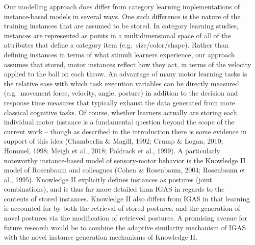 \documentclass[
  jou, donotrepeattitle,floatsintext]{apa7}
\begin{document}
Our modelling approach does differ from category learning implementations of instance-based models in several ways. One such difference is the nature of the training instances that are assumed to be stored. In category learning studies, instances are represented as points in a multidimensional space of all of the attributes that define a category item (e.g.~size/color/shape). Rather than defining instances in terms of what stimuli learners experience, our approach assumes that stored, motor instances reflect how they act, in terms of the velocity applied to the ball on each throw. An advantage of many motor learning tasks is the relative ease with which task execution variables can be directly measured (e.g.~movement force, velocity, angle, posture) in addition to the decision and response time measures that typically exhaust the data generated from more classical cognitive tasks. Of course, whether learners actually are storing each individual motor instance is a fundamental question beyond the scope of the current work -- though as described in the introduction there is some evidence in support of this idea (Chamberlin \& Magill, 1992; Crump \& Logan, 2010; Hommel, 1998; Meigh et al., 2018; Poldrack et al., 1999). A particularly noteworthy instance-based model of sensory-motor behavior is the Knowledge II model of Rosenbaum and colleagues (Cohen \& Rosenbaum, 2004; Rosenbaum et al., 1995). Knowledge II explicitly defines instances as postures (joint combinations), and is thus far more detailed than IGAS in regards to the contents of stored instances. Knowledge II also differs from IGAS in that learning is accounted for by both the retrieval of stored postures, and the generation of novel postures via the modification of retrieved postures. A promising avenue for future research would be to combine the adaptive similarity mechanism of IGAS with the novel instance generation mechanisms of Knowledge II.
\end{document}
